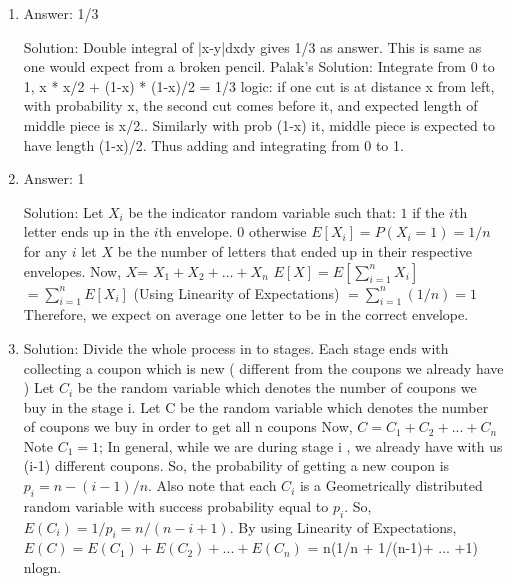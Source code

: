 \begin{enumerate}

\item
Answer: 1/3
 
Solution: Double integral of |x-y|dxdy gives 1/3 as answer. This is same as one would expect from a broken pencil.
Palak's Solution:
Integrate from 0 to 1, x * x/2 + (1-x) * (1-x)/2 = 1/3
logic: if one cut is at distance x from left, with probability x, the second cut comes before it, and expected length of middle piece is x/2.. Similarly with prob (1-x) it, middle piece is expected to have length (1-x)/2. Thus adding and integrating from 0 to 1.




\item
Answer: 1
 
Solution: Let $X_i$ be the indicator random variable such that:
$1$ if the $i$th letter ends up in the $i$th envelope.
$0$ otherwise
$E[X_i] = P(X_i = 1) = 1/n$ for any $i$
let $X$ be the number of letters that ended up in their respective envelopes.
Now, $X$= $X_1 + X_2+ \ldots +X_n$
$E[X] = E[\sum_{i=1}^{n} X_i]$
$= \sum_{i=1}^{n} E[X_i]$ (Using Linearity of Expectations)
$=\sum_{i=1}^{n} (1/n) = 1$
Therefore, we expect on average one letter to be in the correct envelope.




\item
Solution: Divide the whole process in to stages. Each stage ends with collecting a coupon which is new ( different from the coupons we already have )
Let $C_i$ be the random variable which denotes the number of coupons we buy in the stage i.
Let C be the random variable which denotes the number of coupons we buy in order to get all n coupons
Now,
$C= C_1 + C_2 + ... + C_n$
Note $C_1 = 1$;
In general, while we are during stage i , we already have with us (i-1) different coupons. So, the probability of getting a new coupon is $p_i = n-(i-1)/n$. Also note that each $C_i$ is a Geometrically distributed random variable with success probability equal to $p_i$. So, $E(C_i) = 1/p_i = n/(n-i+1)$.
By using Linearity of Expectations,
$E(C) = E(C_1) +E(C_2) + ...+E(C_n)$
= n(1/n + 1/(n-1)+ ... +1)
~ nlogn.




\end{enumerate}
